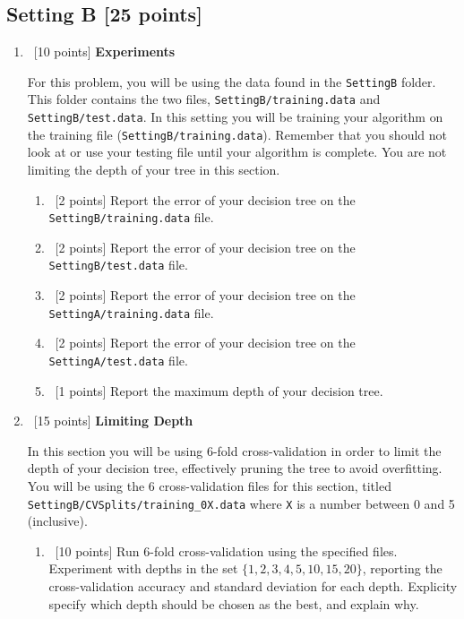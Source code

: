 \subsection*{Setting B [25 points]}

\begin{enumerate}
\item ~[10 points] \textbf{Experiments}
  
  For this problem, you will be using the data found in the \texttt{SettingB} folder. This folder contains the two files, \texttt{SettingB/training.data} and \texttt{SettingB/test.data}. In this setting you will be training your algorithm on the training file (\texttt{SettingB/training.data}). Remember that you should not look at or use your testing file until your algorithm is complete. You are not limiting the depth of your tree in this section. 
  
  \begin{enumerate}
    
  \item ~[2 points]  Report the error of your decision tree on the \texttt{SettingB/training.data} file. 
    
  \item ~[2 points] Report the error of your decision tree on the \texttt{SettingB/test.data} file. 
    
  \item ~[2 points] Report the error of your decision tree on the \texttt{SettingA/training.data} file. 
    
  \item ~[2 points] Report the error of your decision tree on the \texttt{SettingA/test.data} file. 
    
  \item ~[1 points] Report the maximum depth of your decision tree. 
  \end{enumerate}
  
\item ~[15 points] \textbf{Limiting Depth}
  
  In this section you will be using 6-fold cross-validation in order to limit the depth of your decision tree, effectively pruning the tree to avoid overfitting. You will be using the 6 cross-validation files for this section, titled \texttt{SettingB/CVSplits/training\_0X.data} where \texttt{X} is a number between 0 and 5 (inclusive). 
  
  \begin{enumerate}
  \item ~[10 points] Run 6-fold cross-validation using the specified files. Experiment with depths in the set $\{1,2,3,4,5,10,15,20\}$, reporting the cross-validation accuracy and standard deviation for each depth. Explicity specify which depth should be chosen as the best, and explain why. 
    

\end{enumerate}
\end{enumerate}
